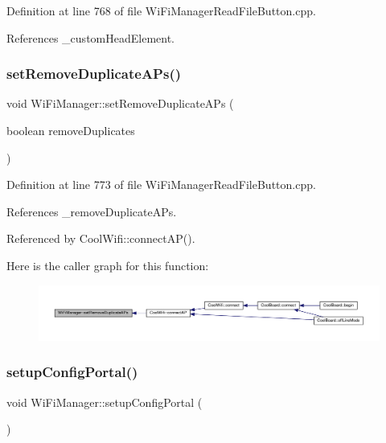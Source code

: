 Definition at line 768 of file Wi\+Fi\+Manager\+Read\+File\+Button.\+cpp.



References \+\_\+custom\+Head\+Element.

\mbox{\label{class_wi_fi_manager_a4dd1dbf4f22900f226a3897b88155212}} 
\subsubsection{\texorpdfstring{set\+Remove\+Duplicate\+A\+Ps()}{setRemoveDuplicateAPs()}}
{\footnotesize\ttfamily void Wi\+Fi\+Manager\+::set\+Remove\+Duplicate\+A\+Ps (\begin{DoxyParamCaption}\item[{boolean}]{remove\+Duplicates }\end{DoxyParamCaption})}



Definition at line 773 of file Wi\+Fi\+Manager\+Read\+File\+Button.\+cpp.



References \+\_\+remove\+Duplicate\+A\+Ps.



Referenced by Cool\+Wifi\+::connect\+A\+P().

Here is the caller graph for this function\+:\nopagebreak
\begin{figure}[H]
\begin{center}
\leavevmode
\includegraphics[width=350pt]{d4/dc8/class_wi_fi_manager_a4dd1dbf4f22900f226a3897b88155212_icgraph}
\end{center}
\end{figure}
\mbox{\label{class_wi_fi_manager_a1743325d0dd86d011df96b22d2a0ddd6}} 
\subsubsection{\texorpdfstring{setup\+Config\+Portal()}{setupConfigPortal()}}
{\footnotesize\ttfamily void Wi\+Fi\+Manager\+::setup\+Config\+Portal (\begin{DoxyParamCaption}{ }\end{DoxyParamCaption})\hspace{0.3cm}{\ttfamily [private]}}



